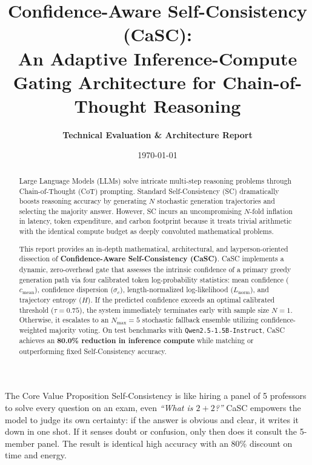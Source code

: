 \documentclass[11pt,a4paper]{article}
\title{\textbf{\LARGE Confidence-Aware Self-Consistency (CaSC):}\\[0.5em] \Large An Adaptive Inference-Compute Gating Architecture for Chain-of-Thought Reasoning}
\author{\textbf{Technical Evaluation \& Architecture Report}}
\date{\today}
\begin{document}
\maketitle

\begin{abstract}
Large Language Models (LLMs) solve intricate multi-step reasoning problems through Chain-of-Thought (CoT) prompting. Standard Self-Consistency (SC) dramatically boosts reasoning accuracy by generating $N$ stochastic generation trajectories and selecting the majority answer. However, SC incurs an uncompromising $N$-fold inflation in latency, token expenditure, and carbon footprint because it treats trivial arithmetic with the identical compute budget as deeply convoluted mathematical problems. 

This report provides an in-depth mathematical, architectural, and layperson-oriented dissection of \textbf{Confidence-Aware Self-Consistency (CaSC)}. CaSC implements a dynamic, zero-overhead gate that assesses the intrinsic confidence of a primary greedy generation path via four calibrated token log-probability statistics: mean confidence ($c_{\text{mean}}$), confidence dispersion ($\sigma_c$), length-normalized log-likelihood ($L_{\text{norm}}$), and trajectory entropy ($H$). If the predicted confidence exceeds an optimal calibrated threshold ($\tau = 0.75$), the system immediately terminates early with sample size $N=1$. Otherwise, it escalates to an $N_{\text{max}}=5$ stochastic fallback ensemble utilizing confidence-weighted majority voting. On test benchmarks with \texttt{Qwen2.5-1.5B-Instruct}, CaSC achieves an \textbf{80.0\% reduction in inference compute} while matching or outperforming fixed Self-Consistency accuracy.
\end{abstract}

\vspace{1em}
\begin{takeawaybox}{The Core Value Proposition}
Self-Consistency is like hiring a panel of 5 professors to solve every question on an exam, even \textit{``What is $2 + 2$?''} CaSC empowers the model to judge its own certainty: if the answer is obvious and clear, it writes it down in one shot. If it senses doubt or confusion, only then does it consult the 5-member panel. The result is identical high accuracy with an 80\% discount on time and energy.
\end{takeawaybox}

\newpage
\tableofcontents
\newpage

\end{document}
